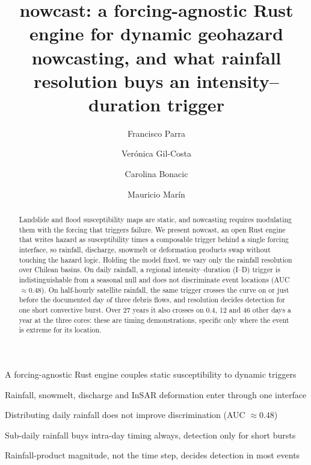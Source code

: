 \documentclass[authoryear,preprint,review,12pt]{elsarticle}
\begin{document}
\begin{frontmatter}

\title{nowcast: a forcing-agnostic Rust engine for dynamic geohazard
nowcasting, and what rainfall resolution buys an intensity--duration trigger}

\author[1]{Francisco Parra}
\author[2]{Ver\'onica Gil-Costa}
\author[1]{Carolina Bonacic}
\author[1]{Mauricio Mar\'in}


\begin{abstract}
Landslide and flood susceptibility maps are static, and nowcasting requires modulating them with the forcing that triggers failure. We present nowcast, an open Rust engine that writes hazard as susceptibility times a composable trigger behind a single forcing interface, so rainfall, discharge, snowmelt or deformation products swap without touching the hazard logic. Holding the model fixed, we vary only the rainfall resolution over Chilean basins. On daily rainfall, a regional intensity--duration (I--D) trigger is indistinguishable from a seasonal null and does not discriminate event locations (AUC $\approx 0.48$). On half-hourly satellite rainfall, the same trigger crosses the curve on or just before the documented day of three debris flows, and resolution decides detection for one short convective burst. Over 27 years it also crosses on 0.4, 12 and 46 other days a year at the three cores: these are timing demonstrations, specific only where the event is extreme for its location.
\end{abstract}

\begin{highlights}
\item A forcing-agnostic Rust engine couples static susceptibility to dynamic triggers
\item Rainfall, snowmelt, discharge and InSAR deformation enter through one interface
\item Distributing daily rainfall does not improve discrimination (AUC $\approx 0.48$)
\item Sub-daily rainfall buys intra-day timing always, detection only for short bursts
\item Rainfall-product magnitude, not the time step, decides detection in most events
\end{highlights}


\end{frontmatter}
\end{document}
